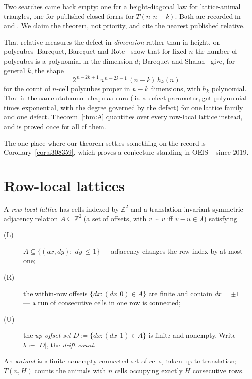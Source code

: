 \documentclass[11pt]{article}
\newcommand{\Z}{\mathbb{Z}}
\begin{document}
Two searches came back empty: one for a height-diagonal law for lattice-animal
triangles, one for published closed forms for $T(n,n-k)$. Both are recorded in
 and .
We claim the theorem, not priority, and cite the nearest published relative.

That relative measures the defect in \emph{dimension} rather than in height, on
polycubes. Barequet, Barequet and Rote~\cite{barequetBarequetRote2010} show that
for fixed $n$ the number of polycubes is a polynomial in the dimension $d$;
Barequet and Shalah~\cite{barequetShalah2017} give, for general $k$, the shape
\[
  2^{\,n-2k+1}\, n^{\,n-2k-1}\,(n-k)\, h_k(n)
\]
for the count of $n$-cell polycubes proper in $n-k$ dimensions, with $h_k$
polynomial. That is the same statement shape as ours (fix a defect parameter, get
polynomial times exponential, with the degree governed by the defect) for
one lattice family and one defect. Theorem~\ref{thm:A} quantifies over every
row-local lattice instead, and is proved once for all of them.

The one place where our theorem settles something on the record is
Corollary~\ref{cor:a308359}, which proves a conjecture standing in OEIS
~\cite{a308359} since 2019.

\section{Row-local lattices}
\label{sec:class}

\begin{definition}
\label{def:rowlocal}
A \emph{row-local lattice} has cells indexed by $\Z^2$ and a
translation-invariant symmetric adjacency relation $A \subseteq \Z^2$ (a set of
offsets, with $u \sim v$ iff $v - u \in A$) satisfying
\begin{description}
\item[(L)] $A \subseteq \{(dx,dy) : |dy| \le 1\}$ --- adjacency changes the row
  index by at most one;
\item[(R)] the within-row offsets $\{dx : (dx,0) \in A\}$ are finite and
  contain $dx = \pm 1$ --- a run of consecutive cells in one row is connected;
\item[(U)] the \emph{up-offset set} $D := \{dx : (dx,1) \in A\}$ is finite and
  nonempty. Write $b := |D|$, the \emph{drift count}.
\end{description}
An \emph{animal} is a finite nonempty connected set of cells, taken up to
translation; $T(n,H)$ counts the animals with $n$ cells occupying exactly $H$
consecutive rows.
\end{definition}
\end{document}
